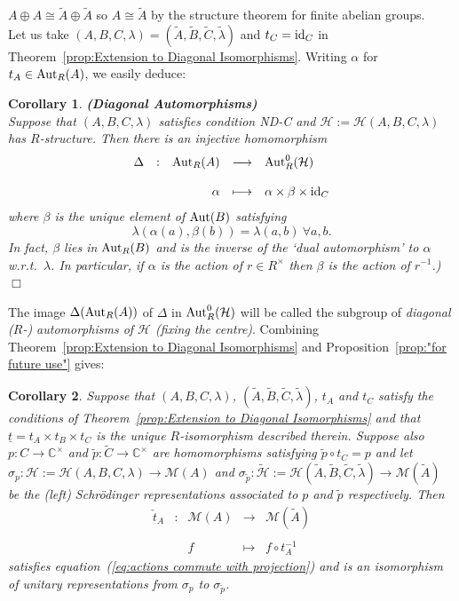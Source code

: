 \documentclass[12pt]{article}
\newtheorem{cor}{Corollary}[section]
\newcommand{\Aut}{{\rm Aut}}
\newcommand{\bbC}{\ensuremath{\mathbb{C}}}\newcommand{\bbCp}{\ensuremath{\mathbb{C}_p}}
\newcommand{\cH}{\ensuremath{\mathcal{H}}}
\newcommand{\cM}{\mathcal{M}}
\newcommand{\displaymapdef}[5]
{
	\begin{array}{rcrcl}
		#1 &:& #2 &\longrightarrow& #3 \\
		& &    &                    \\
		& & #4 &\longmapsto    & #5
	\end{array}
}
\newcommand{\ePf}{~$\Box$\vertsp\par}%
\newcommand{\id}{{\rm id}}
\newcommand{\ie}{{\em i.e.}}
\newcommand{\inv}{^{-1}}%
\renewcommand{\t}[1]{\tilde{#1}}
\newcommand{\vertsp}{\vspace{1ex}}
\newcommand{\Hei}[4]{\cH({#1},{#2},{#3},{#4})}
\newcommand{\HeiStan}{\Hei{A}{B}{C}{\lambda}}
\begin{document}
$A\oplus A\cong \t A\oplus \t A$ so $A\cong\t A$ by the structure theorem for finite abelian groups.\bigskip\\
Let us take $(A,B,C,\lambda)=(\t A,\t B,\t C,\t \lambda)$ and $t_C=\id_C$ in Theorem~\ref{prop:Extension to Diagonal Isomorphisms}. Writing $\alpha$ for $t_A\in \Aut_R(A)$, we easily deduce: 
\begin{cor}{\bf (Diagonal Automorphisms)}\label{cor:Diagonal Automorphisms}\\
	Suppose that $(A,B,C,\lambda)$ satisfies condition ND-C and $\cH:=\HeiStan$ has $R$-structure. Then there is an injective homomorphism
	$$
	\displaymapdef{\Delta}{\Aut_R(A)}{\Aut^0_R(\cH)}{\alpha}{\alpha \times \beta \times \id_C}
	$$
	where $\beta$ is the unique element of $\Aut(B)$ satisfying
	\begin{equation}\label{eq: relation between alpha and beta in diag aut}
	\lambda(\alpha(a),\beta(b))=\lambda(a,b)\ \forall a,b. 
	\end{equation}
	 In fact, $\beta$ lies in $\Aut_R(B)$ and is the inverse of the `dual  automorphism' to $\alpha$ w.r.t.\ $\lambda$. In particular, if $\alpha$ is the action of $r\in R ^\times$ then $\beta$ is the action of $r\inv$.)\ePf  
\end{cor}
The image $\Delta(\Aut_R(A))$ of $\Delta$ in $\Aut^0_R(\cH)$ will be called the subgroup of \textit{diagonal ($R$-) automorphisms of $\cH$ (fixing the centre)}. 
Combining Theorem~\ref{prop:Extension to Diagonal Isomorphisms} and Proposition~\ref{prop:"for future use"} gives:
\begin{cor}\label{cor:Diag Auts}
Suppose that 
$(A,B,C,\lambda)$, 
$({\t A},{\t B},{\t C},{\t \lambda})$, $t_A$ and $t_C$ satisfy the conditions of Theorem~\ref{prop:Extension to Diagonal Isomorphisms} and that $\underline{t}=t_A\times t_B\times t_C$ is the unique $R$-isomorphism described therein. Suppose also  $p:C\rightarrow\bbC^\times$ and ${\t p}:{\t C}\rightarrow\bbC^\times$ are homomorphisms satisfying ${\t p}\circ t_C=p$ and let $\sigma_p:\cH:=\HeiStan\rightarrow\cM(A)$ and 
$\sigma_{\t p}:\t \cH:=\Hei{\t A}{\t B}{\t C}{\t \lambda}\rightarrow\cM(\t A)$ be the (left) Schr\"odinger representations associated to $p$ and $\t p$ respectively. Then 
$$
\displaymapdef{\check t_A}{\cM(A)}{\cM(\t A)}{f}{f\circ t_A\inv}
$$ satisfies equation~(\ref{eq:actions commute with projection})
and is an isomorphism of unitary representations from $\sigma_p$ to $\sigma_{\t p}$. 
\end{cor}
\end{document}

